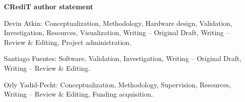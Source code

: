 \textbf{CRediT author statement}\\
\noindent

Devin Atkin: Conceptualization, Methodology, Hardware design, Validation, Investigation, Resources, Visualization, Writing – Original Draft, Writing – Review & Editing, Project administration.

Santiago Fuentes: Software, Validation, Investigation, Writing – Original Draft, Writing – Review & Editing.

Orly Yadid-Pecht: Conceptualization, Methodology, Supervision, Resources, Writing – Review & Editing, Funding acquisition.
